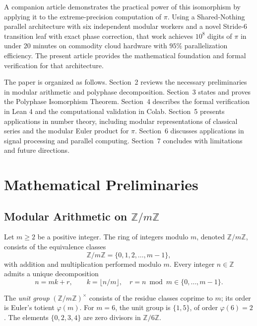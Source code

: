 \documentclass{article}
\theoremstyle{plain}
\theoremstyle{definition}
\theoremstyle{remark}
\begin{document}
A companion article \cite{peinador_modular} demonstrates the practical power of this isomorphism by applying it to the extreme-precision computation of \(\pi\). Using a Shared-Nothing parallel architecture with six independent modular workers and a novel Stride-6 transition leaf with exact phase correction, that work achieves \(10^8\) digits of \(\pi\) in under 20 minutes on commodity cloud hardware with \(95\%\) parallelization efficiency. The present article provides the mathematical foundation and formal verification for that architecture.

The paper is organized as follows. Section~2 reviews the necessary preliminaries in modular arithmetic and polyphase decomposition. Section~3 states and proves the Polyphase Isomorphism Theorem. Section~4 describes the formal verification in Lean 4 and the computational validation in Colab. Section~5 presents applications in number theory, including modular representations of classical series and the modular Euler product for \(\pi\). Section~6 discusses applications in signal processing and parallel computing. Section~7 concludes with limitations and future directions.

\section{Mathematical Preliminaries}
\label{sec:prelim}

\subsection{Modular Arithmetic on \texorpdfstring{\(\mathbb{Z}/m\mathbb{Z}\)}{Z/mZ}}
Let \(m \ge 2\) be a positive integer. The ring of integers modulo \(m\), denoted \(\mathbb{Z}/m\mathbb{Z}\), consists of the equivalence classes
\begin{equation}
\mathbb{Z}/m\mathbb{Z} = \{0, 1, 2, \dots, m-1\},
\end{equation}
with addition and multiplication performed modulo \(m\). Every integer \(n \in \mathbb{Z}\) admits a unique decomposition
\begin{equation}
n = m k + r, \qquad k = \lfloor n/m \rfloor, \quad r = n \bmod m \in \{0, \dots, m-1\}.
\label{eq:divalg}
\end{equation}

The \emph{unit group} \((\mathbb{Z}/m\mathbb{Z})^{\times}\) consists of the residue classes coprime to \(m\); its order is Euler's totient \(\varphi(m)\). For \(m=6\), the unit group is \(\{1,5\}\), of order \(\varphi(6)=2\). The elements \(\{0,2,3,4\}\) are zero divisors in \(\mathbb{Z}/6\mathbb{Z}\).
\end{document}
